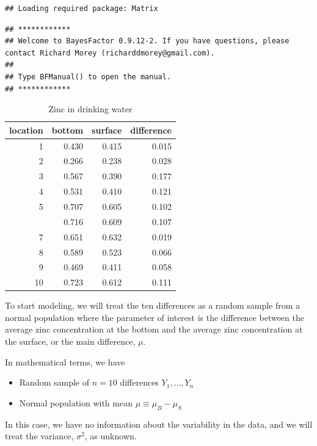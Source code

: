 \documentclass[]{book}
\providecommand{\tightlist}{%
  \setlength{\itemsep}{0pt}\setlength{\parskip}{0pt}}
\theoremstyle{definition}
\theoremstyle{definition}
\theoremstyle{definition}
\theoremstyle{remark}
\begin{document}
\begin{verbatim}
## Loading required package: Matrix
\end{verbatim}

\begin{verbatim}
## ************
## Welcome to BayesFactor 0.9.12-2. If you have questions, please contact Richard Morey (richarddmorey@gmail.com).
## 
## Type BFManual() to open the manual.
## ************
\end{verbatim}

\begin{table}

\caption{\label{tab:zinc-table}Zinc in drinking water}
\centering
\begin{tabular}[t]{rrrr}
\toprule
location & bottom & surface & difference\\
\midrule
1 & 0.430 & 0.415 & 0.015\\
2 & 0.266 & 0.238 & 0.028\\
3 & 0.567 & 0.390 & 0.177\\
4 & 0.531 & 0.410 & 0.121\\
5 & 0.707 & 0.605 & 0.102\\
\addlinespace
6 & 0.716 & 0.609 & 0.107\\
7 & 0.651 & 0.632 & 0.019\\
8 & 0.589 & 0.523 & 0.066\\
9 & 0.469 & 0.411 & 0.058\\
10 & 0.723 & 0.612 & 0.111\\
\bottomrule
\end{tabular}
\end{table}

To start modeling, we will treat the ten differences as a random sample
from a normal population where the parameter of interest is the
difference between the average zinc concentration at the bottom and the
average zinc concentration at the surface, or the main difference,
\(\mu\).

In mathematical terms, we have

\begin{itemize}
\tightlist
\item
  Random sample of \(n= 10\) differences \(Y_1, \ldots, Y_n\)
\item
  Normal population with mean \(\mu \equiv \mu_B - \mu_S\)
\end{itemize}

In this case, we have no information about the variability in the data,
and we will treat the variance, \(\sigma^2\), as unknown.
\end{document}
